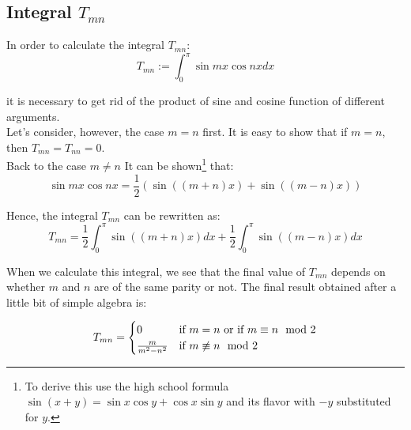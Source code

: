 \documentclass[12pt]{article}
\begin{document}
\begin{appendices}

\section{Integral $T_{mn}$}
\label{integral_tmn}
In order to calculate the integral $T_{mn}$:
\begin{equation}
T_{mn} := \int_{0}^{\pi} \sin mx \cos nx dx
\end{equation}

\noindent it is necessary to get rid of the product of sine and cosine function of different arguments. 
\\ \indent Let's consider, however, the case $m=n$ first. It is easy to show that if $m=n$, 
then $T_{mn} = T_{nn} = 0$.
\\ \indent Back to the case $m \neq n$ It can be shown\footnote{To derive this use the high school formula $\sin (x+y) = \sin x \cos y + \cos x \sin y$ and its flavor with $-y$ substituted for $y$. 
}
 that:
\begin{equation}
\sin mx \cos nx = \frac{1}{2} \left( 
\sin \left((m+n)x\right) + 
\sin \left( (m-n)x \right)
\right)
\end{equation}

Hence, the integral $T_{mn}$ can be rewritten as: 
\begin{equation}
T_{mn} = \frac{1}{2} \int_{0}^{\pi} \sin \left((m+n)x\right) dx + 
\frac{1}{2} \int_{0}^{\pi} \sin \left((m-n)x\right) dx
\end{equation}

When we calculate this integral, we see that the final value of $T_{mn}$ depends on whether $m$ and $n$
are of the same parity or not. The final result obtained after a little bit of simple algebra is:

\begin{equation}
T_{mn} = \begin{cases} 
0 & \text{if $ m = n $ or if $ m \equiv n \mod 2 $} \\ 
\frac{m}{m^2 - n^2} & \text{if $ m \not\equiv n \mod 2 $}
\end{cases}
\end{equation}


\end{appendices}
\end{document}
